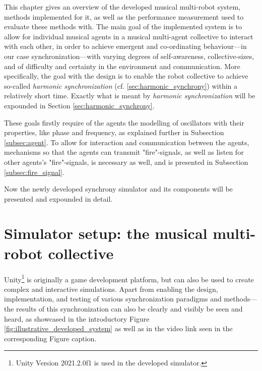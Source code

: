 This chapter gives an overview of the developed musical multi-robot system, methods implemented for it, as well as the performance measurement used to evaluate these methods with. The main goal of the implemented system is to allow for individual musical agents in a musical multi-agent collective to interact with each other, in order to achieve emergent and co-ordinating behaviour—in our case synchronization—with varying degrees of self-awareness, collective-sizes, and of difficulty and certainty in the environment and communication. More specifically, the goal with the design is to enable the robot collective to achieve so-called \textit{harmonic synchronization} (cf. \ref{sec:harmonic_synchrony}) within a relatively short time. Exactly what is meant by \textit{harmonic synchronization} will be expounded in Section \ref{sec:harmonic_synchrony}.

These goals firstly require of the agents the modelling of oscillators with their properties, like phase and frequency, as explained further in Subsection \ref{subsec:agent}. To allow for interaction and communication between the agents, mechanisms so that the agents can transmit "fire"-signals, as well as listen for other agents's "fire"-signals, is necessary as well, and is presented in Subsection \ref{subsec:fire_signal}.

Now the newly developed synchrony simulator and its components will be presented and expounded in detail.




\section{Simulator setup: the musical multi-robot collective}
\label{sec:developed_system}

Unity\footnote{Unity Version 2021.2.0f1 is used in the developed simulator.} is originally a game development platform, but can also be used to create complex and interactive simulations. Apart from enabling the design, implementation, and testing of various synchronization paradigms and methods—the results of this synchronization can also be clearly and visibly be seen and heard, as showcased in the introductory Figure \ref{fig:illustrative_developed_system} as well as in the video link seen in the corresponding Figure caption.

